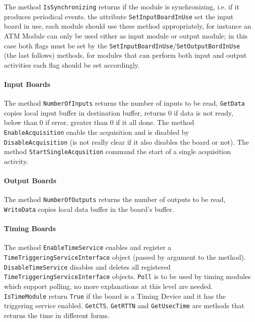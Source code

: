 The method \texttt{IsSynchronizing} returns if the module is synchronizing, i.e. if it produces periodical events. the attribute \texttt{SetInputBoardInUse} set the input board in use, each module should use these method appropriately, for instance an ATM Module can only be used either as input module or output module; in this case both flags must be set by the \texttt{SetInputBoardInUse}/\texttt{SetOutputBordInUse} (the last follows) methods, for modules that can perform both input and output activities each flag should be set accordingly. \\

\paragraph{Input Boards}
The method \texttt{NumberOfInputs} returns the number of inputs to be read, \texttt{GetData} copies local input buffer in destination buffer, returns $0$ if data is not ready, below than $0$ if error, greater than $0$ if it all done.
The method \texttt{EnableAcquisition} enable the acquisition and is disabled by \texttt{DisableAcquisition} (is not really clear if it also disables the board or not). The method \texttt{StartSingleAcqusition} command the start of a single acquisition activity. \\

\paragraph{Output Boards}
The method \texttt{NumberOfOutputs} returns the number of outputs to be read, \texttt{WriteData} copies local data buffer in the board's buffer. \\

\paragraph{Timing Boards}
The method \texttt{EnableTimeService} enables and register a \texttt{TimeTriggeringServiceInterface} object (passed by argument to the method). \texttt{DisableTimeService} disables and deletes all registered \texttt{TimeTriggeringServiceInterface} objects. \texttt{Poll} is to be used by timing modules which support polling, no more explanations at this level are needed. \texttt{IsTimeModule} return \texttt{True} if the board is a Timing Device and it has the triggering service enabled.
\texttt{GetCTS}, \texttt{GetRTTN} and \texttt{GetUsecTime} are methods that returns the time in different forms. \\


